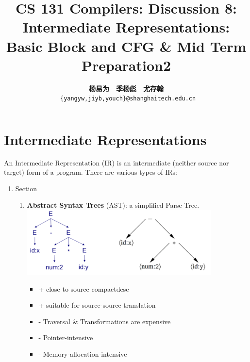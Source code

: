 \documentclass[a4paper]{article}
\title{CS 131 Compilers: Discussion 8: Intermediate Representations: Basic Block and CFG \& Mid Term Preparation2}
\author{\textbf{杨易为}~~\textbf{季杨彪}~~\textbf{尤存翰} \\ \texttt{ \{yangyw,jiyb,youch\}@shanghaitech.edu.cn}}
\theoremstyle{definition}
\begin{document}
\maketitle
\section{Intermediate Representations}
An Intermediate Representation (IR) is an intermediate (neither source nor target) form of a program. There are various types of IRs:
\begin{enumerate}
  \item Section
  \begin{enumerate}
    \item \textbf{Abstract Syntax Trees} (AST): a simplified Parse Tree.\\
    \includegraphics[width=10cm]{img/Snipaste_2021-04-19_07-08-30.png}
    \begin{itemize}
      \item + close to source compactdesc
      \item + suitable for source-source translation
      \item - Traversal \& Transformations are expensive
      \item - Pointer-intensive
      \item - Memory-allocation-intensive
    \end{itemize}


\end{enumerate}
\end{enumerate}
\end{document}
